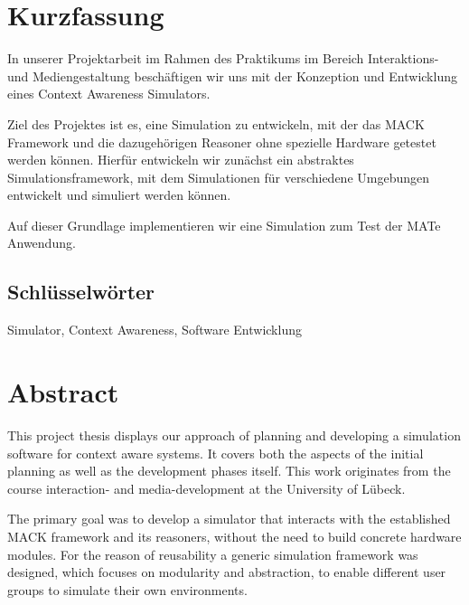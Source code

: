 \documentclass[11pt,    %
  english,ngerman,      %
  paper=a4,             %
  oneside,              %
  tablecaptionbelow,    %
  DIV=calc              %
  ]{scrbook}            %
\newcommand{\imiscomment}[1]{\textit{#1}}
\begin{document}
\chapter*{Kurzfassung}
\thispagestyle{empty}

In unserer Projektarbeit im Rahmen des Praktikums im Bereich Interaktions- und Mediengestaltung beschäftigen wir uns mit der Konzeption und Entwicklung eines Context Awareness Simulators.

Ziel des Projektes ist es, eine Simulation zu entwickeln, mit der das MACK Framework und die dazugehörigen Reasoner ohne spezielle Hardware getestet werden können. Hierfür entwickeln wir zunächst ein abstraktes Simulationsframework, mit dem Simulationen für verschiedene Umgebungen entwickelt und simuliert werden können.

Auf dieser Grundlage implementieren wir eine Simulation zum Test der MATe Anwendung.

\vfill

\section*{Schlüsselwörter} Simulator, Context Awareness, Software Entwicklung


\chapter*{Abstract}
\thispagestyle{empty}

This project thesis displays our approach of planning and developing a simulation software for context aware systems. It covers both the aspects of the initial planning as well as the development phases itself.
This work originates from the course interaction- and media-development at the University of Lübeck.

The primary goal was to develop a simulator that interacts with the established MACK framework and its reasoners, without the need to build concrete hardware modules.
For the reason of reusability a generic simulation framework was designed, which focuses on modularity and abstraction, to enable  different user groups to simulate their own environments.
\end{document}
